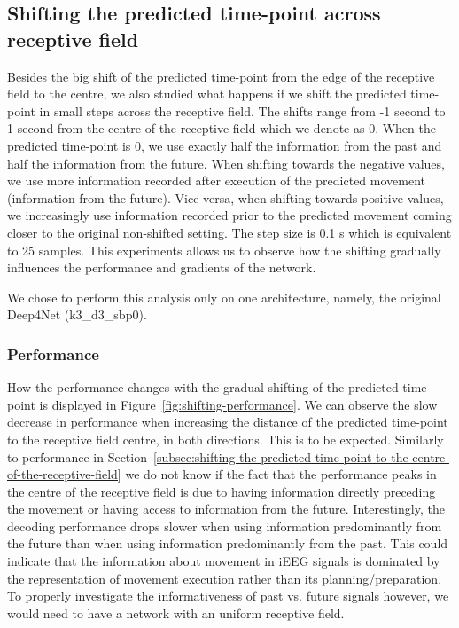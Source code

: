 \subsection{Shifting the predicted time-point across receptive field}\label{subsec:shifting-the-predicted-time-point-across-receptive-field}
Besides the big shift of the predicted time-point from the edge of the receptive field to the centre, we also studied what happens if we shift the predicted time-point in small steps across the receptive field. 
The shifts range from  -1 second  to 1 second from the centre of the receptive field which we denote as 0.
When the predicted time-point is 0, we use exactly half the information from the past and half the information from the future.
When shifting towards the negative values, we use more information recorded after execution of the predicted movement (information from the future). 
Vice-versa, when shifting towards positive values, we increasingly use information recorded prior to the predicted movement coming closer to the original non-shifted setting.  
The step size is 0.1 s which is equivalent to 25 samples.
This experiments allows us to observe how the shifting gradually influences the performance and gradients of the network. 

We chose to perform this analysis only on one architecture, namely, the original Deep4Net (k3\_d3\_sbp0). 

\subsubsection{Performance}\label{subsubsec:across-shiftig-performace}
How the performance changes with the gradual shifting of the predicted time-point is displayed in Figure~\ref{fig:shifting-performance}.
We can observe the slow decrease in performance when increasing the distance of the predicted time-point to the receptive field centre, in both directions. 
This is to be expected. 
Similarly to performance in Section~\ref{subsec:shifting-the-predicted-time-point-to-the-centre-of-the-receptive-field} we do not know if the fact that the performance peaks in the centre of the receptive field is due to having information directly preceding the movement or having access to information from the future. 
Interestingly, the decoding performance drops slower when using information predominantly from the future than when using information predominantly from the past. This could indicate that the information about movement in iEEG signals is dominated by the representation of movement execution rather than its planning/preparation. 
To properly investigate the informativeness of past vs. future signals however, we would need to have a network with an uniform receptive field. 

